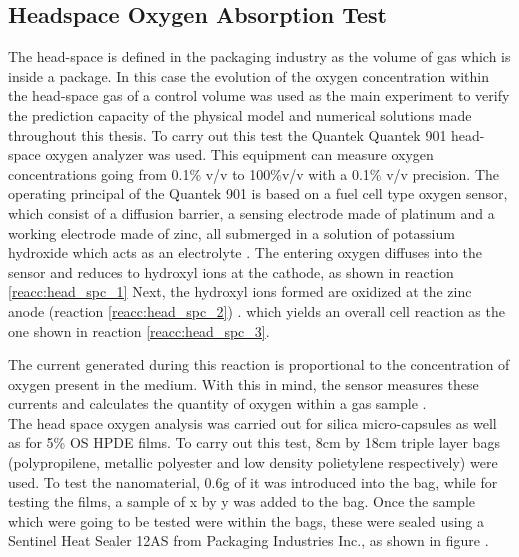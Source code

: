 \begin{refsection}
\subsection{Headspace Oxygen Absorption Test}\label{sec:headspace}
The head-space is defined in the packaging industry as the volume of gas which is inside a package. In this case the evolution of the oxygen concentration within the head-space gas of a control volume was used as the main experiment to verify the prediction capacity of the physical model and numerical solutions made throughout this thesis. To carry out this test the Quantek Quantek 901 head-space oxygen analyzer was used. This equipment can measure oxygen concentrations going from 0.1\% v/v to 100\%v/v with a 0.1\% v/v precision. The operating principal of the Quantek 901 is based on a fuel cell type oxygen sensor, which consist of a diffusion barrier, a sensing electrode made of platinum and a working electrode made of zinc, all submerged in a solution of potassium hydroxide which acts as an electrolyte \cite{Boissevain1996CorporateGuide}. The entering oxygen diffuses into the sensor and reduces to hydroxyl ions at the cathode, as shown in reaction \ref{reacc:head_spc_1}  Next, the hydroxyl ions formed are oxidized at the zinc anode (reaction \ref{reacc:head_spc_2}) .
 which yields an overall cell reaction as the one shown in reaction \ref{reacc:head_spc_3}.

 
 The current generated during this reaction is proportional to the concentration of oxygen present in the medium. With this in mind,  the sensor measures these currents and calculates the quantity of oxygen within a gas sample \cite{GarciaMora2015KineticScavengers, Boissevain1996CorporateGuide}.\\
 
 The head space oxygen analysis was carried out for silica micro-capsules as well as for 5\% OS HPDE films. To carry out this test, 8cm by 18cm triple layer bags (polypropilene, metallic polyester and low density polietylene respectively) were used. To test the nanomaterial, 0.6g of it was introduced into the bag, while for testing the films, a sample of x by y was added to the bag.  Once the sample which were going to be tested were within the bags, these were sealed using a Sentinel Heat Sealer 12AS from Packaging Industries Inc., as shown in figure .
 




\end{refsection}